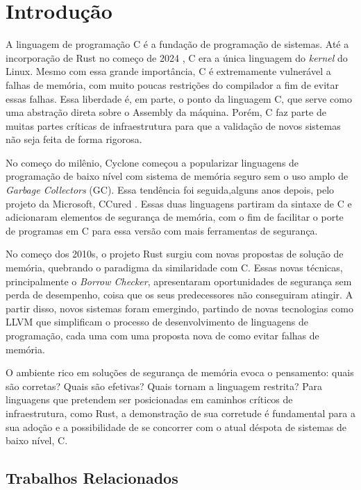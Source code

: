 \chapter{Introdução}

A linguagem de programação C \cite{CLANG} é a fundação de programação de sistemas. Até a incorporação de Rust no começo de 2024 \cite{RUSTFORLINUX}, C era a única linguagem do \emph{kernel} do Linux. Mesmo com essa grande importância, C é extremamente vulnerável a falhas de memória, com muito poucas restrições do compilador a fim de evitar essas falhas. Essa liberdade é, em parte, o ponto da linguagem C, que serve como uma abstração direta sobre o Assembly da máquina. Porém, C faz parte de muitas partes críticas de infraestrutura para que a validação de novos sistemas não seja feita de forma rigorosa. 

No começo do milênio, Cyclone \cite{CYCLONE1} começou a popularizar linguagens de programação de baixo nível com sistema de memória seguro sem o uso amplo de \emph{Garbage Collectors} (GC). Essa tendência foi seguida,alguns anos depois, pelo projeto da Microsoft, CCured \cite{CCURED}. Essas duas linguagens partiram da sintaxe de C e adicionaram elementos de segurança de memória, com o fim de facilitar o porte de programas em C para essa versão com mais ferramentas de segurança.

No começo dos 2010s, o projeto Rust \cite{RUSTBOOK} surgiu com novas propostas de solução de memória, quebrando o paradigma da similaridade com C. Essas novas técnicas, principalmente o \emph{Borrow Checker}, apresentaram oportunidades de segurança sem perda de desempenho, coisa que os seus predecessores não conseguiram atingir. A partir disso, novos sistemas foram emergindo, partindo de novas tecnologias como LLVM \cite{LLVM} que simplificam o processo de desenvolvimento de linguagens de programação, cada uma com uma proposta nova de como evitar falhas de memória.

O ambiente rico em soluções de segurança de memória evoca o pensamento: quais são corretas? Quais são efetivas? Quais tornam a linguagem restrita? Para linguagens que pretendem ser posicionadas em caminhos críticos de infraestrutura, como Rust, a demonstração de sua corretude é fundamental para a sua adoção e a possibilidade de se concorrer com o atual déspota de sistemas de baixo nível, C.

\section{Trabalhos Relacionados}


